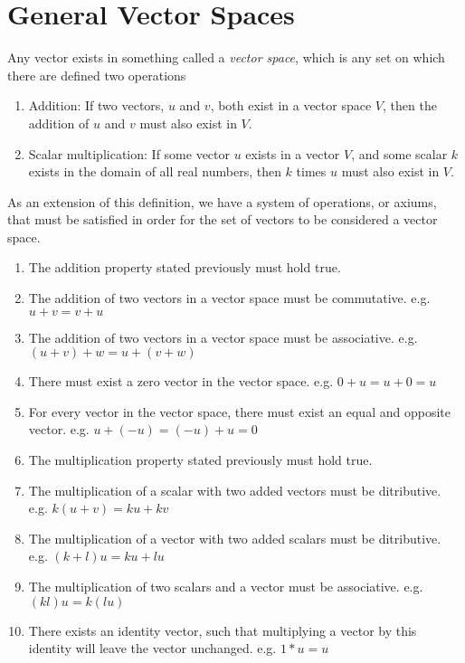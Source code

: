 \section{General Vector Spaces}\label{generalvectorspaces}
Any vector exists in something called a \emph{vector space}, which is any set on
which there are defined two operations
\begin{enumerate}
    \item Addition: If two vectors, $u$ and $v$, both exist in a vector space
        $V$, then the addition of $u$ and $v$ must also exist in $V$.    
    \item Scalar multiplication: If some vector $u$ exists in a vector $V$,
        and some scalar $k$ exists in the domain of all real numbers, then $k$
        times $u$ must also exist in $V$.
\end{enumerate}
As an extension of this definition, we have a system of operations, or axiums,
that must be satisfied in order for the set of vectors to be considered a vector
space. 
\begin{enumerate}
    \item The addition property stated previously must hold true.
    \item The addition of two vectors in a vector space must be commutative.
        e.g. $u + v = v + u$
    \item The addition of two vectors in a vector space must be associative.
        e.g. $(u + v) + w = u + (v + w)$
    \item There must exist a zero vector in the vector space. e.g. $0 + u = u +
        0 = u$
    \item For every vector in the vector space, there must exist an equal
        and opposite vector. e.g. $u + (-u) = (-u) + u = 0$
    \item The multiplication property stated previously must hold true.
    \item The multiplication of a scalar with two added vectors must be
        ditributive. e.g. $k(u + v) = ku + kv$ 
    \item The multiplication of a vector with two added scalars must be
        ditributive. e.g. $(k + l)u = ku + lu$ 
    \item The multiplication of two scalars and a vector must be associative.
        e.g. $(kl)u = k(lu)$
    \item There exists an identity vector, such that multiplying a vector by
        this identity will leave the vector unchanged. e.g. $1 * u = u$
\end{enumerate}
